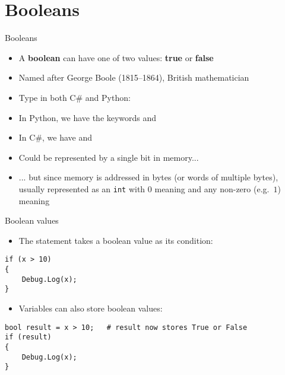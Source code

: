 \part{Booleans}
\frame{\partpage}

\begin{frame}{Booleans}
	\begin{itemize}
		\pause\item A \textbf{boolean} can have one of two values: \textbf{true} or \textbf{false}
		\pause\item Named after George Boole (1815--1864), British mathematician
		\pause\item Type in both C\# and Python: 
		\pause\item In Python, we have the keywords  and 
		\pause\item In C\#, we have  and 
		\pause\item Could be represented by a single bit in memory...
		\pause\item ... but since memory is addressed in bytes (or words of multiple bytes),
			usually represented as an \lstinline{int} with $0$ meaning 
			and any non-zero (e.g.\ $1$) meaning 
	\end{itemize}
\end{frame}

\begin{frame}[fragile]{Boolean values}
	\begin{itemize}
		\pause\item The  statement takes a boolean value as its condition:
	\end{itemize}
	\begin{lstlisting}
if (x > 10)
{
    Debug.Log(x);
}
	\end{lstlisting}
	\begin{itemize}
		\pause\item Variables can also store boolean values:
	\end{itemize}
	\begin{lstlisting}
bool result = x > 10;   # result now stores True or False
if (result)
{
    Debug.Log(x);
}
	\end{lstlisting}
\end{frame}

